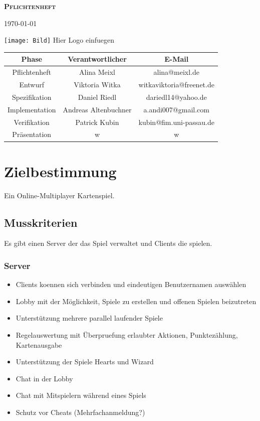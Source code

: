\documentclass{article}
\begin{document}
\begin{titlepage}

\begin{center}
\textbf{\textsc{\LARGE Pflichtenheft}}

{\large \today}

\vspace{6cm}
\texttt{[image: Bild]}
Hier Logo einfuegen

\vspace{6cm}

\begin{tabular}{|c|c|c|}\hline
   Phase & Verantwortlicher & E-Mail \\ \hline\hline
   Pflichtenheft & Alina  Meixl  &  alina@meixl.de \\ \hline
   Entwurf & Viktoria Witka & witkaviktoria@freenet.de \\ \hline
   Spezifikation & Daniel Riedl & dariedl14@yahoo.de \\ \hline
   Implementation & Andreas Altenbuchner& a.andi007@gmail.com\\ \hline
   Verifikation &Patrick Kubin & kubin@fim.uni-passau.de\\ \hline
   Präsentation & w& w\\ \hline
 \end{tabular}

\end{center}

\end{titlepage}


\tableofcontents
\newpage

\section{Zielbestimmung}
Ein Online-Multiplayer Kartenspiel.

\subsection{Musskriterien}
Es gibt einen \gls{Server} der das Spiel verwaltet und \glspl{Client} die spielen.
\subsubsection{\gls{Server}}
\begin{itemize}
	\item \glspl{Client} koennen sich verbinden und eindeutigen Benutzernamen auswählen
	\item \gls{Lobby} mit der Möglichkeit, Spiele zu erstellen und offenen Spielen beizutreten
	\item Unterstützung mehrere parallel laufender Spiele
	\item Regelauswertung mit Überpruefung erlaubter Aktionen, Punktezählung, Kartenausgabe
	\item Unterstützung der Spiele Hearts und Wizard
	\item Chat in der \gls{Lobby}
	\item Chat mit Mitspielern während eines Spiels
	\item Schutz vor Cheats (Mehrfachanmeldung?)
\end{itemize}
\end{document}
